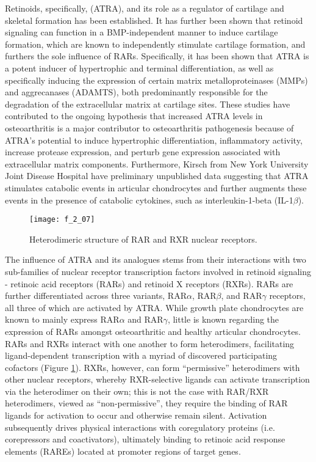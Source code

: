 \begin{refsection}
Retinoids, specifically,  (ATRA), and its role
as a regulator of cartilage and skeletal formation has been
established.\cite{Koyama1999} It has further been shown that retinoid signaling
can function in a BMP-independent manner to induce cartilage formation, which
are known to independently stimulate cartilage formation, and furthers the sole
influence of RARs.\cite{Weston2000} Specifically, it has been shown that ATRA is
a potent inducer of hypertrophic and terminal differentiation, as well as
specifically inducing the expression of certain matrix metalloproteinases (MMPs)
and aggrecanases (ADAMTS), both predominantly responsible for the degradation of
the extracellular matrix at cartilage
sites.\cite{Wang2002,Iwamoto1994,Koyama1999,Johnson2003} These studies have
contributed to the ongoing hypothesis that increased ATRA levels in
osteoarthritis is a major contributor to osteoarthritis pathogenesis because of
ATRA's potential to induce hypertrophic differentiation, inflammatory activity,
increase protease expression, and perturb gene expression associated with
extracellular matrix components. Furthermore, Kirsch  from New
York University Joint Disease Hospital have preliminary unpublished data
suggesting that ATRA stimulates catabolic events in articular chondrocytes and
further augments these events in the presence of catabolic cytokines, such as
interleukin-1-beta (IL-1${\beta}$).
\begin{figure}[h!] \centering \texttt{[image: f\_2\_07]}
    \caption[Heterodimeric structure of RAR and RXR nuclear receptors.]{Heterodimeric structure of RAR and RXR nuclear receptors.\cite{DeLera2007}}\label{fig:retinoid_receptor_structures} \end{figure}
The influence of ATRA and its analogues stems from their interactions with two
sub-families of nuclear receptor transcription factors involved in retinoid
signaling - retinoic acid receptors (RARs) and retinoid X receptors (RXRs). RARs
are further differentiated across three variants, RAR${\alpha}$, RAR${\beta}$,
and RAR${\gamma}$ receptors, all three of which are activated by
ATRA.\cite{Chambon1996} While growth plate chondrocytes are known to mainly
express RAR${\alpha}$ and RAR${\gamma}$,\cite{Koyama1999} little is known
regarding the expression of RARs amongst osteoarthritic and healthy articular
chondrocytes. RARs and RXRs interact with one another to form heterodimers,
facilitating ligand-dependent transcription with a myriad of discovered
participating cofactors (Figure \ref{fig:retinoid_receptor_structures}). RXRs, however,
can form ``permissive'' heterodimers with other nuclear receptors, whereby
RXR-selective ligands can activate transcription via the heterodimer on their
own; this is not the case with RAR/RXR heterodimers, viewed as
``non-permissive'', they require the binding of RAR ligands for activation to
occur and otherwise remain silent.\cite{Altucci2007} Activation subsequently
drives physical interactions with coregulatory proteins (i.e. corepressors and
coactivators), ultimately binding to retinoic acid response elements (RAREs)
located at promoter regions of target genes.\cite{Germain2002,DeLera2007}


\end{refsection}
